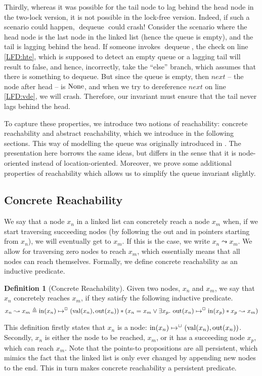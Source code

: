 \documentclass[a4paper, 10pt]{report}
\theoremstyle{definition}
\newtheorem{definition}{Definition}[section]
\newcommand{\dequeue}{\operatorname{dequeue}}
\newcommand{\nIn}[1]{\operatorname{in}(#1)}
\newcommand{\nVal}[1]{\operatorname{val}(#1)}
\newcommand{\nOut}[1]{\operatorname{out}(#1)}
\newcommand{\node}{x}
\newcommand{\nodeM}[1]{\node_{#1}}
\newcommand{\isNode}[1]{\nIn{#1} \mapsto^{\persistently} (\nVal{#1}, \nOut{#1})}
\newcommand{\reach}[2]{#1 \leadsto #2}
\begin{document}
Thirdly, whereas it was possible for the tail node to lag behind the head node in the two-lock version, it is not possible in the lock-free version. Indeed, if such a scenario could happen, $\dequeue$ could crash! Consider the scenario where the head node is the last node in the linked list (hence the queue is empty), and the tail is lagging behind the head. If someone invokes $\dequeue$, the check on line \ref{LFD:hte}, which is supposed to detect an empty queue or a lagging tail will result to false, and hence, incorrectly, take the ``else'' branch, which assumes that there is something to dequeue. But since the queue is empty, then $next$ -- the node after head -- is $\operatorname{None}$, and when we try to dereference $next$ on line \ref{LFD:vde}, we will crash. Therefore, our invariant must ensure that the tail never lags behind the head.

To capture these properties, we introduce two notions of reachability: concrete reachability and abstract reachability, which we introduce in the following sections. This way of modelling the queue was originally introduced in \citet{DBLP:conf/cpp/VindumB21}. The presentation here borrows the same ideas, but differs in the sense that it is node-oriented instead of location-oriented. Moreover, we prove some additional properties of reachability which allows us to simplify the queue invariant slightly.

\subsection{Concrete Reachability}
We say that a node $\nodeM{n}$ in a linked list can concretely reach a node $\nodeM{m}$ when, if we start traversing succeeding nodes (by following the out and in pointers starting from $\nodeM{n}$), we will eventually get to $\nodeM{m}$. If this is the case, we write $\reach{\nodeM{n}}{\nodeM{m}}$. We allow for traversing zero nodes to reach $\nodeM{m}$, which essentially means that all nodes can reach themselves. Formally, we define concrete reachability as an inductive predicate.
\begin{definition}[Concrete Reachability]
  Given two nodes, $\nodeM{n}$ and $\nodeM{m}$, we say that $\nodeM{n}$ concretely reaches $\nodeM{m}$, if they satisfy the following inductive predicate.
  \begin{equation*}
    \reach{\nodeM{n}}{\nodeM{m}} \eqdef \isNode{\nodeM{n}} \star{} (\nodeM{n} = \nodeM{m} \lor{} \Exists \nodeM{p} . \nOut{\nodeM{n}} \mapsto^{\persistently} \nIn{\nodeM{p}} \star{} \reach{\nodeM{p}}{\nodeM{m}})
  \end{equation*}
\end{definition}
This definition firstly states that $\nodeM{n}$ is a node: $\isNode{\nodeM{n}}$. Secondly, $\nodeM{n}$ is either the node to be reached, $\nodeM{m}$, or it has a succeeding node $\nodeM{p}$, which can reach $\nodeM{m}$.
Note that the points-to propositions are all persistent, which mimics the fact that the linked list is only ever changed by appending new nodes to the end. This in turn makes concrete reachability a persistent predicate.
\end{document}
